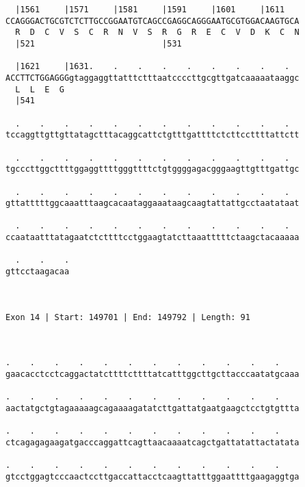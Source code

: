 \documentclass{article}
\begin{document}
\begin{Verbatim}
  |1561     |1571     |1581     |1591     |1601     |1611   
CCAGGGACTGCGTCTCTTGCCGGAATGTCAGCCGAGGCAGGGAATGCGTGGACAAGTGCA
  R  D  C  V  S  C  R  N  V  S  R  G  R  E  C  V  D  K  C  N
  |521                          |531                        
  
  |1621     |1631.    .    .    .    .    .    .    .    .  
ACCTTCTGGAGGGgtaggaggttatttctttaatccccttgcgttgatcaaaaataaggc
  L  L  E  G                                                
  |541                                                      
  
  .    .    .    .    .    .    .    .    .    .    .    .  
tccaggttgttgttatagctttacaggcattctgtttgattttctcttccttttattctt
                                                            
  .    .    .    .    .    .    .    .    .    .    .    .  
tgcccttggcttttggaggttttgggttttctgtggggagacgggaagttgtttgattgc
                                                            
  .    .    .    .    .    .    .    .    .    .    .    .  
gttatttttggcaaatttaagcacaataggaaataagcaagtattattgcctaatataat
                                                            
  .    .    .    .    .    .    .    .    .    .    .    .  
ccaataatttatagaatctcttttcctggaagtatcttaaatttttctaagctacaaaaa
                                                            
  .    .    .
gttcctaagacaa
             
             
 
Exon 14 | Start: 149701 | End: 149792 | Length: 91



.    .    .    .    .    .    .    .    .    .    .    .    
gaacacctcctcaggactatcttttcttttatcatttggcttgcttacccaatatgcaaa
                                                            
.    .    .    .    .    .    .    .    .    .    .    .    
aactatgctgtagaaaaagcagaaaagatatcttgattatgaatgaagctcctgtgttta
                                                            
.    .    .    .    .    .    .    .    .    .    .    .    
ctcagagagaagatgacccaggattcagttaacaaaatcagctgattatattactatata
                                                            
.    .    .    .    .    .    .    .    .    .    .    .    
gtcctggagtcccaactccttgaccattacctcaagttatttggaattttgaagaggtga
                                                            

\end{Verbatim}
\end{document}
